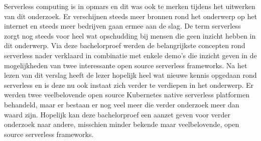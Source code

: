 Serverless computing is in opmars en dit was ook te merken tijdens het uitwerken van dit onderzoek. Er verschijnen steeds meer bronnen rond het onderwerp op het internet en steeds meer bedrijven gaan ermee aan de slag. De term serverless zorgt nog steeds voor heel wat opschudding bij mensen die geen inzicht hebben in dit onderwerp. Via deze bachelorproef werden de belangrijkste concepten rond serverless nader verklaard in combinatie met enkele demo's die inzicht geven in de mogelijkheden van twee interessante open source serverless frameworks. Na het lezen van dit verslag heeft de lezer hopelijk heel wat nieuwe kennis opgedaan rond serverless en is deze nu ook instaat zich verder te verdiepen in het onderwerp. Er werden twee veelbelovende open source Kubernetes native serverless platformen behandeld, maar er bestaan er nog veel meer die verder onderzoek meer dan waard zijn. Hopelijk kan deze bachelorproef een aanzet geven voor verder onderzoek naar andere, misschien minder bekende maar veelbelovende, open source serverless frameworks.